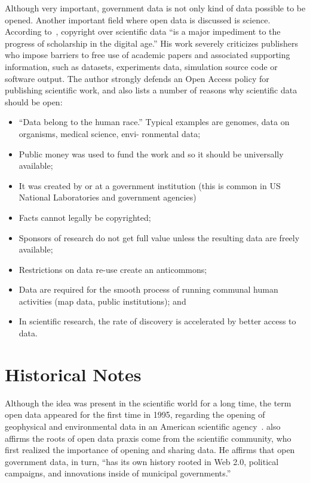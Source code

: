 Although very important, government data is not only kind of data possible to be opened.
Another important field where open data is discussed is science.
According to~, copyright over scientific data ``is a major impediment to the progress of scholarship in the digital age.''
His work severely criticizes publishers who impose barriers to free use of academic papers and associated supporting information, such as datasets, experiments data, simulation source code or software output.
The author strongly defends an Open Access policy for publishing scientific work, and also lists a number of reasons why scientific data should be open:

\begin{itemize}
	\item  ``Data belong to the human race.'' Typical examples are genomes, data on organisms, medical science, envi- ronmental data;
	\item Public money was used to fund the work and so it should be universally available;
	\item It was created by or at a government institution (this is common in US National Laboratories and government agencies)
	\item Facts cannot legally be copyrighted;
	\item Sponsors of research do not get full value unless the resulting data are freely available;
	\item Restrictions on data re-use create an anticommons;
	\item Data are required for the smooth process of running communal human activities (map data, public institutions); and
	\item In scientific research, the rate of discovery is accelerated by better access to data.
\end{itemize}

\section{Historical Notes}

Although the idea was present in the scientific world for a long time, the term open data appeared for the first time in 1995, regarding the opening of geophysical and environmental data in an American scientific agency~\cite{Chignard2013}. 
 also affirms the roots of open data praxis come from the scientific community, who first realized the importance of opening and sharing data.
He affirms that open government data, in turn, ``has its own history rooted in Web 2.0, political campaigns, and innovations inside of municipal governments.''

